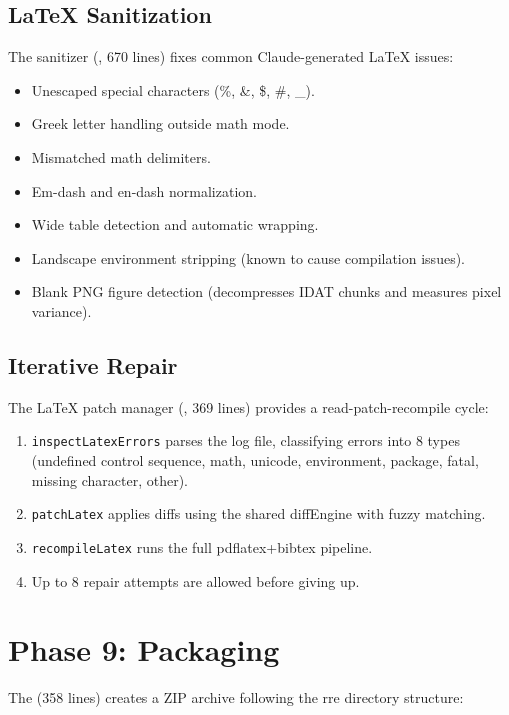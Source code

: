 \subsection{LaTeX Sanitization}

The sanitizer (, 670 lines) fixes common Claude-generated \LaTeX{} issues:

\begin{itemize}
  \item Unescaped special characters (\%, \&, \$, \#, \_).
  \item Greek letter handling outside math mode.
  \item Mismatched math delimiters.
  \item Em-dash and en-dash normalization.
  \item Wide table detection and automatic wrapping.
  \item Landscape environment stripping (known to cause compilation issues).
  \item Blank PNG figure detection (decompresses IDAT chunks and measures pixel variance).
\end{itemize}

\subsection{Iterative Repair}

The \LaTeX{} patch manager (, 369 lines) provides a read-patch-recompile cycle:

\begin{enumerate}
  \item \texttt{inspectLatexErrors} parses the log file, classifying errors into 8 types (undefined control sequence, math, unicode, environment, package, fatal, missing character, other).
  \item \texttt{patchLatex} applies diffs using the shared diffEngine with fuzzy matching.
  \item \texttt{recompileLatex} runs the full pdflatex+bibtex pipeline.
  \item Up to 8 repair attempts are allowed before giving up.
\end{enumerate}

\section{Phase 9: Packaging}
\label{sec:pipeline:packaging}

The  (358 lines) creates a ZIP archive following the \gls{rre} directory structure:

